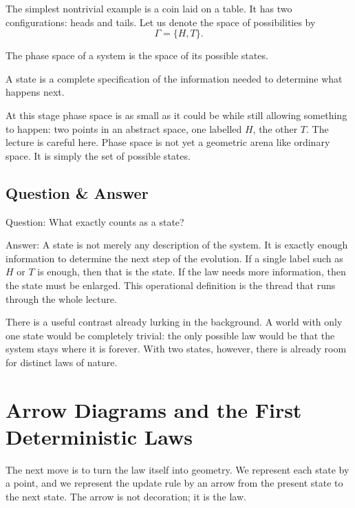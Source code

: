 The simplest nontrivial example is a coin laid on a table. It has two configurations: heads and tails. Let us denote the space of possibilities by
\begin{equation}
\Gamma=\{H,T\}.
\end{equation}

\begin{definition}
The phase space of a system is the space of its possible states.
\end{definition}

\begin{definition}
A state is a complete specification of the information needed to determine what happens next.
\end{definition}

At this stage phase space is as small as it could be while still allowing something to happen: two points in an abstract space, one labelled \(H\), the other \(T\). The lecture is careful here. Phase space is not yet a geometric arena like ordinary space. It is simply the set of possible states.

\subsection{Question \& Answer}

Question: What exactly counts as a state?

Answer: A state is not merely any description of the system. It is exactly enough information to determine the next step of the evolution. If a single label such as \(H\) or \(T\) is enough, then that is the state. If the law needs more information, then the state must be enlarged. This operational definition is the thread that runs through the whole lecture.

There is a useful contrast already lurking in the background. A world with only one state would be completely trivial: the only possible law would be that the system stays where it is forever. With two states, however, there is already room for distinct laws of nature.

\section{Arrow Diagrams and the First Deterministic Laws}

The next move is to turn the law itself into geometry. We represent each state by a point, and we represent the update rule by an arrow from the present state to the next state. The arrow is not decoration; it is the law.

